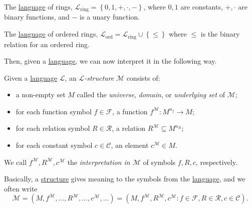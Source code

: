 \begin{eg}[Ring]\label{eg:language-ring}
	The \hyperref[def:language]{language} of rings, \(\mathcal{L} _{\text{ring} } = \left\{ 0, 1, +, \cdot, - \right\} \), where \(0, 1\) are constants, \(+, \cdot\) are binary functions, and \(-\) is a unary function.
\end{eg}

\begin{eg}\label{eg:language-ring}
	The \hyperref[def:language]{language} of ordered rings, \(\mathcal{L} _{\text{ord} } = \mathcal{L} _{\text{ring} } \cup \left\{ \leq \right\} \) where \(\leq \) is the binary relation for an ordered ring.
\end{eg}

Then, given a \hyperref[def:language]{language}, we can now interpret it in the following way.

\begin{definition}[Structure]\label{def:structure}
	Given a \hyperref[def:language]{language} \(\mathcal{L} \), an \emph{\(\mathcal{L} \)-structure} \(\mathcal{M} \) consists of:
	\begin{itemize}
		\item a non-empty set \(M\) called the \emph{universe}, \emph{domain}, or \emph{underlying set} of \(\mathcal{M} \);
		\item for each function symbol \(f\in \mathcal{F} \), a function \(f^{\mathcal{M} } \colon M^{n_f} \to M\);
		\item for each relation symbol \(R\in \mathcal{R} \), a relation \(R^{\mathcal{M} } \subseteq M^{n_R}\);
		\item for each constant symbol \(c\in \mathcal{C} \), an element \(c^{\mathcal{M} }\in M\).
	\end{itemize}
\end{definition}

\begin{note}[Interpretation]
	We call \(f^{\mathcal{M} }, R^{\mathcal{M} }, c^{\mathcal{M} }\) the \emph{interpretation in \(\mathcal{M} \)} of symbols \(f, R, c\), respectively.
\end{note}

Basically, a \hyperref[def:structure]{structure} gives meaning to the symbols from the \hyperref[def:language]{language}, and we often write
\[
	\mathcal{M}
	= (M, f^{\mathcal{M} }, \ldots , R^{\mathcal{M} }, \ldots , c^{\mathcal{M} }, \ldots)
	= (M, f^{\mathcal{M} }, R^{\mathcal{M} }, c^{\mathcal{M} } \colon f\in \mathcal{F} , R\in \mathcal{R} , c\in \mathcal{C} ).
\]

